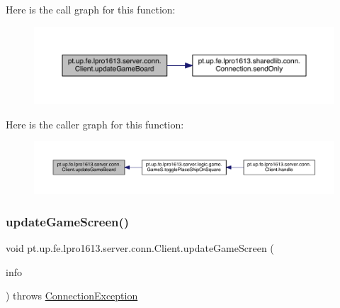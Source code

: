 Here is the call graph for this function\+:
\nopagebreak
\begin{figure}[H]
\begin{center}
\leavevmode
\includegraphics[width=350pt]{classpt_1_1up_1_1fe_1_1lpro1613_1_1server_1_1conn_1_1_client_a68fc46855fd613c9ca06c32da08c2f5a_cgraph}
\end{center}
\end{figure}
Here is the caller graph for this function\+:
\nopagebreak
\begin{figure}[H]
\begin{center}
\leavevmode
\includegraphics[width=350pt]{classpt_1_1up_1_1fe_1_1lpro1613_1_1server_1_1conn_1_1_client_a68fc46855fd613c9ca06c32da08c2f5a_icgraph}
\end{center}
\end{figure}
\hypertarget{classpt_1_1up_1_1fe_1_1lpro1613_1_1server_1_1conn_1_1_client_ad3cc8b10b942f6260a0e7db7f5a0a538}{}\label{classpt_1_1up_1_1fe_1_1lpro1613_1_1server_1_1conn_1_1_client_ad3cc8b10b942f6260a0e7db7f5a0a538} 
\subsubsection{\texorpdfstring{update\+Game\+Screen()}{updateGameScreen()}}
{\footnotesize\ttfamily void pt.\+up.\+fe.\+lpro1613.\+server.\+conn.\+Client.\+update\+Game\+Screen (\begin{DoxyParamCaption}\item[{\hyperlink{classpt_1_1up_1_1fe_1_1lpro1613_1_1sharedlib_1_1structs_1_1_game_u_i_info}{Game\+U\+I\+Info}}]{info }\end{DoxyParamCaption}) throws \hyperlink{classpt_1_1up_1_1fe_1_1lpro1613_1_1sharedlib_1_1exceptions_1_1_connection_exception}{Connection\+Exception}}

